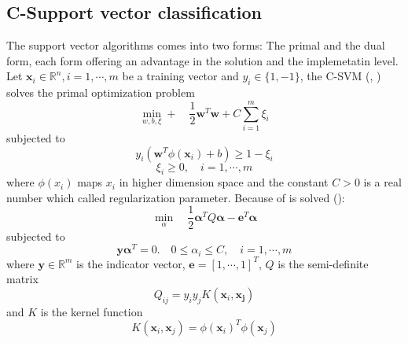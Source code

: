 \documentclass[../Main/thesis.tex]{subfiles}
\begin{document}
\subsection{C-Support vector classification}
The support vector algorithms comes into two forms: The primal and the dual form, each form offering an advantage in the solution and the implemetatin level.
Let $\bm{x}_{i}\in \mathbb{R}^{n}, i = 1, \cdots, m$ be a training vector and $y_{i}\in \{1,-1\}$, the C-SVM (\cite{bosser1992}, \cite{vapnik1995}) solves the primal optimization problem
\begin{equation}
	\min_{w,b,\xi} +\quad \frac{1}{2}\bm{w}^{T}\bm{w} + C\sum_{i = 1}^{m}\xi_{i}
\end{equation}
subjected to 
\begin{equation}
	y_{i}(\bm{w}^{T}\phi(\bm{x}_{i}) + b) \geq 1 - \xi_{i}
\end{equation}
\begin{equation}
	\xi_{i} \geq 0, \quad i = 1, \cdots, m
\end{equation}
where $\phi(x_{i})$ maps $x_{i}$ in higher dimension space and the constant $C > 0$ is a real number which called regularization parameter.
Because of  is solved (\cite{chang2001}):
\begin{equation}
	\min_{\alpha}\quad \frac{1}{2}\bm{\alpha}^{T}Q\bm{\alpha}-\bm{e}^{T}\bm{\alpha}
\end{equation}
%
subjected to 
\begin{equation}
	\bm{y}\bm{\alpha}^{T} = 0. \quad 0 \leq \alpha_{i} \leq C,\quad  i = 1,\cdots, m
\end{equation}
\justify
where $\bm{y}\in \mathbb{R}^{m}$ is the indicator vector, $\bm{e} = [1,\cdots,1]^{T}$, $Q$ is the semi-definite matrix
\begin{equation}
	Q_{ij} = y_{i}y_{j}K(\bm{x}_{i},\bm{x_{j}})
\end{equation}
and $K$ is the kernel function 
\begin{equation}
	K(\bm{x}_{i},\bm{x}_{j}) = \phi(\bm{x}_{i})^{T}\phi(\bm{x}_{j})
\end{equation}
\end{document}
